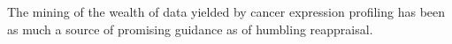 The mining of the wealth of data yielded by cancer expression profiling has been
as much a source of promising guidance as of humbling reappraisal.











